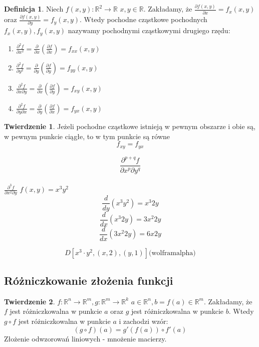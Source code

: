 \documentclass{article}
\theoremstyle{definition}
\newtheorem{de}{Definicja}[subsection]
\theoremstyle{definition}
\newtheorem{tw}{Twierdzenie}[subsection]
\theoremstyle{definition}
\theoremstyle{definition}
\theoremstyle{definition}
\theoremstyle{definition}
\theoremstyle{definition}
\begin{document}
\begin{de}
    Niech $f(x,y): \mathbb{R}^2 \rightarrow \mathbb{R}$ $x,y\in\mathbb{R}$.
    Zakładamy, że $\frac{\partial f(x,y)}{\partial x} = f_x(x,y)$ oraz $\frac{\partial f(x,y)}{\partial y} = f_y(x,y)$.
    Wtedy pochodne cząstkowe pochodnych $f_x(x,y), f_y(x,y)$ nazywamy pochodnymi cząstkowymi drugiego rzędu:

    \begin{enumerate}
        \item $\frac{\partial^2 f}{\partial x^2} = \frac{\partial}{\partial x} \left(\frac{\partial f}{\partial x}\right) = f_{xx} (x,y)$
        \item $\frac{\partial^2 f}{\partial y^2} = \frac{\partial}{\partial y} \left(\frac{\partial f}{\partial y}\right) = f_{yy} (x,y)$
        \item $\frac{\partial^2 f}{\partial x \partial y} = \frac{\partial}{\partial x} \left(\frac{\partial f}{\partial y}\right) = f_{xy} (x,y)$
        \item $\frac{\partial^2 f}{\partial y \partial x} = \frac{\partial}{\partial y} \left(\frac{\partial f}{\partial x}\right) = f_{yx} (x,y)$
    \end{enumerate}
\end{de}

\begin{tw}
  Jeżeli pochodne cząstkowe istnieją w pewnym obszarze i obie są, w pewnym punkcie ciągłe, to w tym punkcie są równe
  \[ f_{xy} = f_{yx} \]
\end{tw}

\[\frac{\partial^{p+q} f}{\partial x^p \partial y^q}\]\\

$\frac{\partial^3 f}{\partial x^2 \partial y}$
$f(x,y) = x^3 y^2$\\

\[\frac{d}{dy} (x^3 y^2) = x^3 2y\]
\[\frac{d}{dx} (x^3 2y) = 3x^2 2y\]
\[\frac{d}{dx} (3x^2 2y) = 6x 2y\]

\[D\left[x^3 \cdot y^2, (x,2), (y,1)\right] \text {(wolframalpha)}\]

\subsection{Różniczkowanie złożenia funkcji}

\begin{tw}
    $f:\mathbb{R}^n \rightarrow \mathbb{R}^m, g: \mathbb{R}^m \rightarrow \mathbb{R}^k$ 
    $a\in\mathbb{R}^n, b=f(a)\in \mathbb{R}^m$. Zakładamy, że $f$ jest różniczkowalna w punkcie $a$
    oraz $g$ jest różniczkowalna w punkcie $b$. Wtedy $g\circ f$ jest różniczkowalna w punkcie $a$ i zachodzi wzór:
    \[(g\circ f)(a) = g'\left(f(a)\right) \circ f'(a)\]
    Złożenie odwzorowań liniowych - mnożenie macierzy.
\end{tw}
\end{document}
